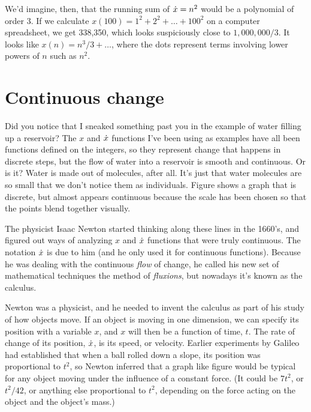 We'd imagine, then, that the running sum of $\dot{x}=n^2$ would
be a polynomial of order 3. If we calculate
$x(100)=1^2+2^2+\ldots+100^2$ on a computer spreadsheet, we
get 338,350, which looks suspiciously close to $1,000,000/3$.
It looks like $x(n)=n^3/3+\ldots$, where
the dots represent terms involving lower powers of $n$
such as $n^2$.

\section{Continuous change}

%
Did you notice that I sneaked something past you in the example
of water filling up a reservoir? The $x$ and $\dot{x}$ functions I've
been using as examples have all been functions defined on the integers,
so they represent change that happens in discrete steps, but the flow
of water into a reservoir is smooth and continuous. Or is it? Water is
made out of molecules, after all. It's just that water molecules are so small that
we don't notice them as individuals. Figure  shows
a graph that is discrete, but almost appears continuous because the scale has
been chosen so that the points blend together visually.


The physicist Isaac Newton started
thinking along these lines in the 1660's, and figured out ways of analyzing
$x$ and $\dot{x}$ functions that were truly continuous. The notation $\dot{x}$
is due to him (and he only used it for continuous functions). Because he was
dealing with the continuous \emph{flow} of change, he called his new set of mathematical
techniques the method of \emph{fluxions}, but nowadays it's known as the calculus.

Newton was a physicist, and he needed to invent the calculus as part of his study
of how objects move. If an object is moving in one dimension, we can specify its
position with a variable $x$, and $x$ will then be a function of time, $t$.
The rate of change of its position, $\dot{x}$, is its speed, or velocity.
Earlier experiments by Galileo
had established that when a ball rolled down
a slope, its position was proportional to $t^2$, so Newton inferred that
a graph like figure  would be typical for any object
moving under the influence of a constant force. (It could be $7t^2$, or
$t^2/42$, or anything else proportional to $t^2$, depending on the force
acting on the object and the object's mass.)

